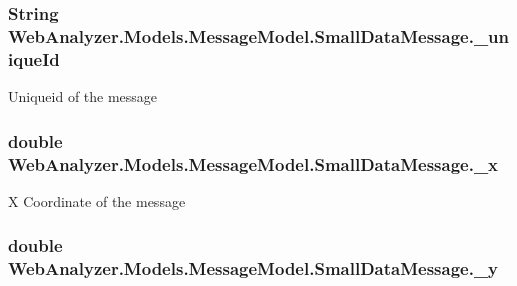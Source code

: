 \subsubsection[{\+\_\+unique\+Id}]{\setlength{\rightskip}{0pt plus 5cm}String Web\+Analyzer.\+Models.\+Message\+Model.\+Small\+Data\+Message.\+\_\+unique\+Id\hspace{0.3cm}{\ttfamily [private]}}\label{class_web_analyzer_1_1_models_1_1_message_model_1_1_small_data_message_a02f84bd7416e754bb7955a14e5fce9c3}


Uniqueid of the message 

\hypertarget{class_web_analyzer_1_1_models_1_1_message_model_1_1_small_data_message_a88d0991ed95524d8e89f945516e859fe}{}
\subsubsection[{\+\_\+x}]{\setlength{\rightskip}{0pt plus 5cm}double Web\+Analyzer.\+Models.\+Message\+Model.\+Small\+Data\+Message.\+\_\+x\hspace{0.3cm}{\ttfamily [private]}}\label{class_web_analyzer_1_1_models_1_1_message_model_1_1_small_data_message_a88d0991ed95524d8e89f945516e859fe}


X Coordinate of the message 

\hypertarget{class_web_analyzer_1_1_models_1_1_message_model_1_1_small_data_message_aa0ed275ee89ea7ba8914cd611aae4c0d}{}
\subsubsection[{\+\_\+y}]{\setlength{\rightskip}{0pt plus 5cm}double Web\+Analyzer.\+Models.\+Message\+Model.\+Small\+Data\+Message.\+\_\+y\hspace{0.3cm}{\ttfamily [private]}}\label{class_web_analyzer_1_1_models_1_1_message_model_1_1_small_data_message_aa0ed275ee89ea7ba8914cd611aae4c0d}


